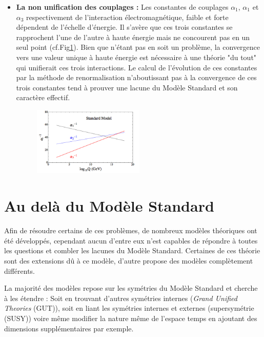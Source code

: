 \begin{itemize}[label=$\bullet$]
\item \textbf{La non unification des couplages : }Les constantes de couplages $\alpha_{1}$, $\alpha_{1}$ et $\alpha_{3}$ respectivement de l'interaction électromagnétique, faible et forte dépendent de l'échelle d'énergie. Il s'avère que ces trois constantes se rapprochent l'une de l'autre à haute énergie mais ne concourent pas en un seul point (cf.Fig\ref{constantes}). Bien que n'étant pas en soit un problème, la convergence vers une valeur unique à haute énergie est nécessaire à une théorie "du tout" qui unifierait ces trois interactions. Le calcul de l'évolution de ces constantes par la méthode de renormalisation n'aboutissant pas à la convergence de ces trois constantes tend à prouver une lacune du Modèle Standard et son caractère effectif.
\begin{figure}[ht!]
\centering
\includegraphics[width=0.50\textwidth]{SM/couplageSM.jpg}
\label{constantes}
\end{figure}
\end{itemize}

\section{Au delà du Modèle Standard}
Afin de résoudre certains de ces problèmes, de nombreux modèles théoriques ont été développés, cependant aucun d'entre eux n'est capables de répondre à toutes les questions et combler les lacunes du Modèle Standard. Certaines de ces théorie sont des extensions dû à ce modèle, d'autre propose des modèles complètement différents.

La majorité des modèles repose sur les symétries du Modèle Standard et cherche à les étendre : Soit en trouvant d'autres symétries internes (\textit{Grand Unified Theories} (GUT)), soit en liant les symétries internes et externes (supersymétrie (SUSY)) voire même modifier la nature même de l'espace temps en ajoutant des dimensions supplémentaires par exemple.

